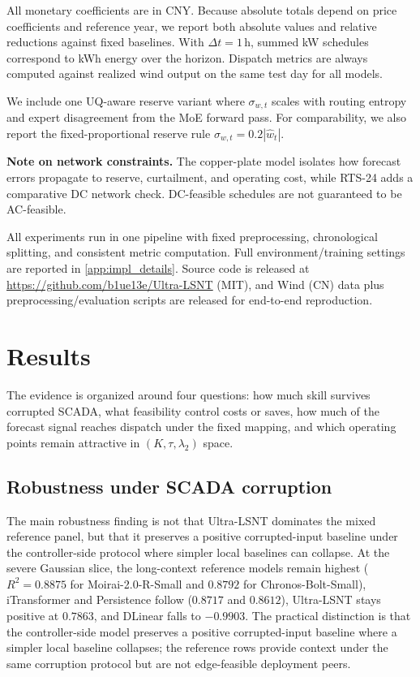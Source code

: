 ﻿\documentclass[review,1p,times]{elsarticle}
\begin{document}
All monetary coefficients are in CNY. Because absolute totals depend on price coefficients and reference year, we report both absolute values and relative reductions against fixed baselines. With $\Delta t=1$\,h, summed kW schedules correspond to kWh energy over the horizon. Dispatch metrics are always computed against realized wind output on the same test day for all models.

We include one UQ-aware reserve variant where $\sigma_{w,t}$ scales with routing entropy and expert disagreement from the MoE forward pass. For comparability, we also report the fixed-proportional reserve rule $\sigma_{w,t}=0.2|\hat{w}_t|$.



\noindent\textbf{Note on network constraints.} The copper-plate model isolates how forecast errors propagate to reserve, curtailment, and operating cost, while RTS-24 adds a comparative DC network check. DC-feasible schedules are not guaranteed to be AC-feasible.

All experiments run in one pipeline with fixed preprocessing, chronological splitting, and consistent metric computation. Full environment/training settings are reported in \ref{app:impl_details}. Source code is released at \url{https://github.com/b1ue13e/Ultra-LSNT} (MIT), and Wind (CN) data plus preprocessing/evaluation scripts are released for end-to-end reproduction.

\section{Results}
\label{sec:results}
The evidence is organized around four questions: how much skill survives corrupted SCADA, what feasibility control costs or saves, how much of the forecast signal reaches dispatch under the fixed mapping, and which operating points remain attractive in $(K,\tau,\lambda_2)$ space.

\subsection{Robustness under SCADA corruption}
\label{subsec:results_main}
\label{subsec:results_robustness}
\label{subsubsec:universal_noise}
The main robustness finding is not that Ultra-LSNT dominates the mixed reference panel, but that it preserves a positive corrupted-input baseline under the controller-side protocol where simpler local baselines can collapse. At the severe Gaussian slice, the long-context reference models remain highest ($R^2=0.8875$ for Moirai-2.0-R-Small and $0.8792$ for Chronos-Bolt-Small), iTransformer and Persistence follow ($0.8717$ and $0.8612$), Ultra-LSNT stays positive at $0.7863$, and DLinear falls to $-0.9903$. The practical distinction is that the controller-side model preserves a positive corrupted-input baseline where a simpler local baseline collapses; the reference rows provide context under the same corruption protocol but are not edge-feasible deployment peers.
\end{document}
